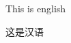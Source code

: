 \documentclass{article}
\newcommand{\textcn}[1]{\begin{CJK}{UTF8}{gbsn}#1\end{CJK}}
\begin{document}
This is english

\textcn{这是汉语}
\end{document}
